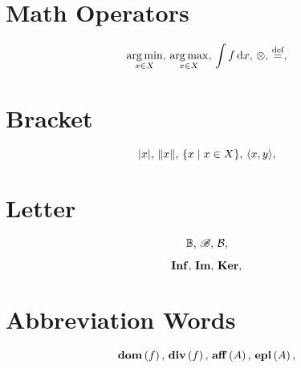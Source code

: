 \documentclass{article}
\begin{document}
\section{Math Operators}
\begin{equation}
    \mathop{\arg\min}_{x\in X},\,
    \mathop{\arg\max}_{x\in X},\,
    \int f \,\mathrm{d} x,\,
    \otimes,\,
    \mathop{\overset{\text{def}}{=}},\,
\end{equation}


\section{Bracket}
\begin{equation}
    \mathop{\left| x \right|},\,
    \mathop{\left\| x \right\|},\,
    \mathop{\left\{ x \;|\; x\in X \right\}},\,
    \mathop{\left\langle x, y \right\rangle},\,
\end{equation}


\section{Letter}
\begin{equation}
    \mathbb{B},\,
    \mathscr{B},\,
    \mathcal{B},\,
\end{equation}

\begin{equation}
    \mathbf{Inf},\,
    \mathbf{Im},\,
    \mathbf{Ker},\,
\end{equation}


\section{Abbreviation Words}
\begin{equation}
    \mathbf{dom}\left( f \right),\,
    \mathbf{div}\left( f \right),\,
    \mathbf{aff}\left( A \right),\,
    \mathbf{epi}\left( A \right),\,
\end{equation}
\end{document}
